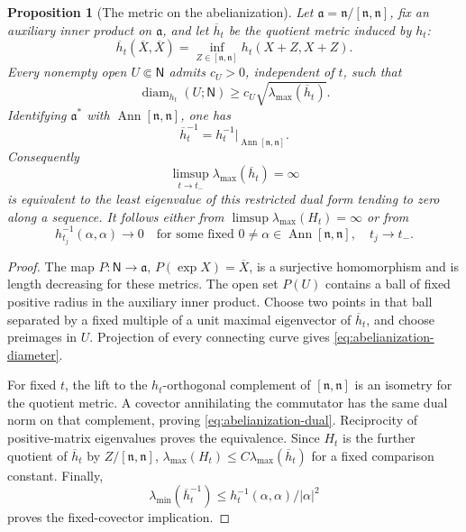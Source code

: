 \documentclass[10pt,a4paper]{article}
\numberwithin{equation}{section}
\newtheorem{proposition}[theorem]{Proposition}
\theoremstyle{definition}
\theoremstyle{remark}
\newcommand{\diam}{\operatorname{diam}}
\begin{document}
\begin{proposition}[The metric on the abelianization]
\label{prop:abelianization-growth}
Let $\mathfrak a=\mathfrak n/[\mathfrak n,\mathfrak n]$, fix an auxiliary
inner product on $\mathfrak a$, and let $\overline h_t$ be the quotient
metric induced by $h_t$:
\[
 \overline h_t(\overline X,\overline X)
 =\inf_{Z\in[\mathfrak n,\mathfrak n]}h_t(X+Z,X+Z).
\]
Every nonempty open $U\Subset\mathsf N$ admits $c_U>0$, independent of $t$,
such that
\begin{equation}
 \diam_{h_t}(U;\mathsf N)
 \ge c_U\sqrt{\lambda_{\max}(\overline h_t)}.
 \label{eq:abelianization-diameter}
\end{equation}
Identifying $\mathfrak a^*$ with
$\operatorname{Ann}[\mathfrak n,\mathfrak n]$, one has
\begin{equation}
 \overline h_t^{-1}
 =h_t^{-1}\big|_{\operatorname{Ann}[\mathfrak n,\mathfrak n]}.
 \label{eq:abelianization-dual}
\end{equation}
Consequently
\begin{equation}
 \limsup_{t\to t_-}\lambda_{\max}(\overline h_t)=\infty
 \label{eq:abelianization-growth}
\end{equation}
is equivalent to the least eigenvalue of this restricted dual form tending
to zero along a sequence.  It follows either from
$\limsup\lambda_{\max}(H_t)=\infty$ or from
\begin{equation}
 h_{t_j}^{-1}(\alpha,\alpha)\longrightarrow0
 \quad\text{for some fixed }0\ne\alpha\in
 \operatorname{Ann}[\mathfrak n,\mathfrak n],\quad t_j\to t_-.
 \label{eq:fixed-closed-growth}
\end{equation}
\end{proposition}

\begin{proof}
The map $P:\mathsf N\to\mathfrak a$, $P(\exp X)=\overline X$, is a
surjective homomorphism and is length decreasing for these metrics.
The open set $P(U)$ contains a ball of fixed positive radius in the
auxiliary inner product.  Choose two points in that ball separated by
a fixed multiple of a unit maximal eigenvector of $\overline h_t$, and
choose preimages in $U$.  Projection of every connecting curve gives
\eqref{eq:abelianization-diameter}.

For fixed $t$, the lift to the $h_t$-orthogonal complement of
$[\mathfrak n,\mathfrak n]$ is an isometry for the quotient metric.
A covector annihilating the commutator has the same dual norm on that
complement, proving \eqref{eq:abelianization-dual}.  Reciprocity of
positive-matrix eigenvalues proves the equivalence.  Since $H_t$ is the
further quotient of $\overline h_t$ by $Z/[\mathfrak n,\mathfrak n]$,
$\lambda_{\max}(H_t)\le C\lambda_{\max}(\overline h_t)$ for a fixed
comparison constant.  Finally,
\[
 \lambda_{\min}(\overline h_t^{-1})
 \le h_t^{-1}(\alpha,\alpha)/|\alpha|^2
\]
proves the fixed-covector implication.
\end{proof}
\end{document}
